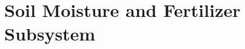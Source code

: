\documentclass[../main]{subfiles}
\begin{document}
\chapter{Soil Moisture and Fertilizer Subsystem} \label{chp:soilMoistFertSubsystem}

%



%
\end{document}
